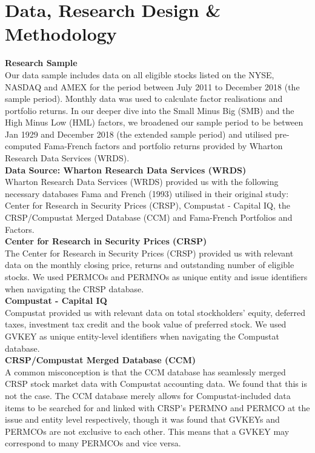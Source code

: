 \documentclass[12pt]{article}
\begin{document}
\newpage
		
\section{Data, Research Design \& Methodology}
\noindent \textbf{Research Sample}\\
\noindent Our data sample includes data on all eligible stocks listed on the NYSE, NASDAQ and AMEX for the period between July 2011 to December 2018 (the sample period). Monthly data was used to calculate factor realisations and portfolio returns. In our deeper dive into the Small Minus Big (SMB) and the High Minus Low (HML) factors, we broadened our sample period to be between Jan 1929 and December 2018 (the extended sample period) and utilised pre-computed Fama-French factors and portfolio returns provided by Wharton Research Data Services (WRDS).\\

\noindent \textbf{Data Source: Wharton Research Data Services (WRDS)}\\
Wharton Research Data Services (WRDS) provided us with the following necessary databases Fama and French (1993) utilised in their original study: Center for Research in Security Prices (CRSP), Compustat - Capital IQ, the CRSP/Compustat Merged Database (CCM) and Fama-French Portfolios and Factors. \\

\noindent \textbf{Center for Research in Security Prices (CRSP)}\\
\noindent The Center for Research in Security Prices (CRSP) provided us with relevant data on the monthly closing price, returns and outstanding number of eligible stocks. We used PERMCOs and PERMNOs as unique entity and issue identifiers when navigating the CRSP database.\\

\noindent \textbf{Compustat - Capital IQ}\\
\noindent Compustat provided us with relevant data on total stockholders' equity, deferred taxes, investment tax credit and the book value of preferred stock. We used GVKEY as unique entity-level identifiers when navigating the Compustat database.\\

\noindent \textbf{CRSP/Compustat Merged Database (CCM)}\\
\noindent A common misconception is that the CCM database has seamlessly merged CRSP stock market data with Compustat accounting data. We found that this is not the case. The CCM database merely allows for Compustat-included data items to be searched for and linked with CRSP's PERMNO and PERMCO at the issue and entity level respectively, though it was found that GVKEYs and PERMCOs are not exclusive to each other. This means that a GVKEY may correspond to many PERMCOs and vice versa. \\
\end{document}
